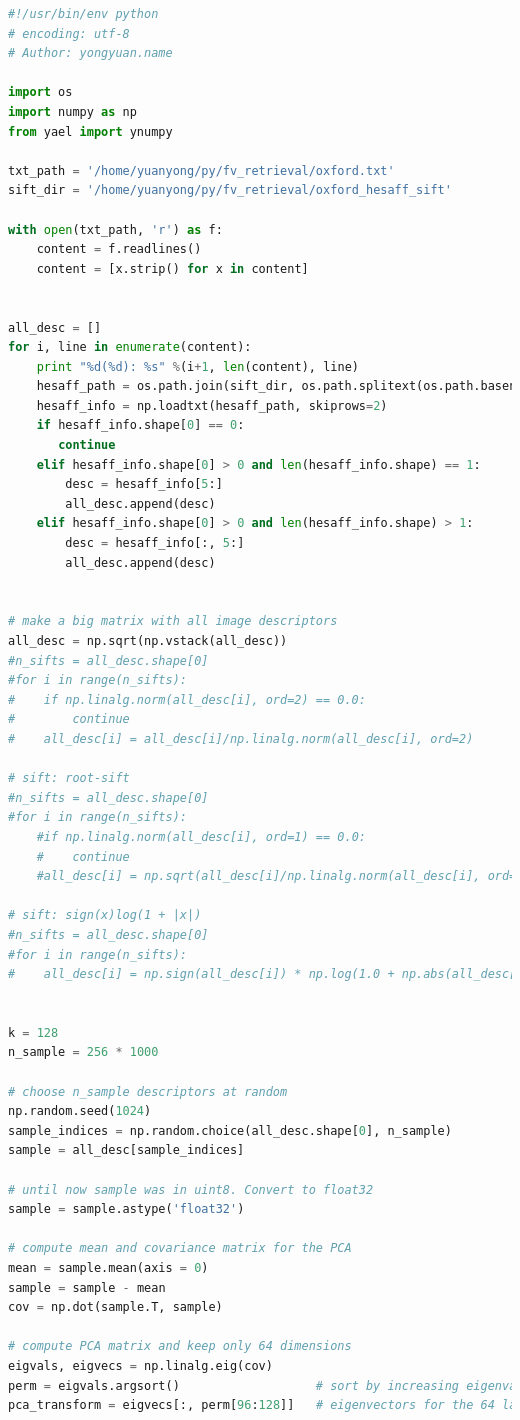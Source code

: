 \documentclass[color=cyan,mathpazo,titlestyle=hang]{elegantbook}
\begin{document}
\begin{lstlisting}[language=python]
#!/usr/bin/env python
# encoding: utf-8
# Author: yongyuan.name

import os
import numpy as np
from yael import ynumpy

txt_path = '/home/yuanyong/py/fv_retrieval/oxford.txt'
sift_dir = '/home/yuanyong/py/fv_retrieval/oxford_hesaff_sift'

with open(txt_path, 'r') as f:
    content = f.readlines()
    content = [x.strip() for x in content]


all_desc = []
for i, line in enumerate(content):
    print "%d(%d): %s" %(i+1, len(content), line)
    hesaff_path = os.path.join(sift_dir, os.path.splitext(os.path.basename(line))[0] + '.hesaff.sift')
    hesaff_info = np.loadtxt(hesaff_path, skiprows=2)
    if hesaff_info.shape[0] == 0:
       continue
    elif hesaff_info.shape[0] > 0 and len(hesaff_info.shape) == 1:
        desc = hesaff_info[5:]
        all_desc.append(desc)
    elif hesaff_info.shape[0] > 0 and len(hesaff_info.shape) > 1:
        desc = hesaff_info[:, 5:]
        all_desc.append(desc)


# make a big matrix with all image descriptors
all_desc = np.sqrt(np.vstack(all_desc))
#n_sifts = all_desc.shape[0]
#for i in range(n_sifts):
#    if np.linalg.norm(all_desc[i], ord=2) == 0.0:
#        continue
#    all_desc[i] = all_desc[i]/np.linalg.norm(all_desc[i], ord=2)

# sift: root-sift
#n_sifts = all_desc.shape[0]
#for i in range(n_sifts):
    #if np.linalg.norm(all_desc[i], ord=1) == 0.0:
    #    continue
    #all_desc[i] = np.sqrt(all_desc[i]/np.linalg.norm(all_desc[i], ord=1))

# sift: sign(x)log(1 + |x|)
#n_sifts = all_desc.shape[0]
#for i in range(n_sifts):
#    all_desc[i] = np.sign(all_desc[i]) * np.log(1.0 + np.abs(all_desc[i]))


k = 128
n_sample = 256 * 1000

# choose n_sample descriptors at random
np.random.seed(1024)
sample_indices = np.random.choice(all_desc.shape[0], n_sample)
sample = all_desc[sample_indices]

# until now sample was in uint8. Convert to float32
sample = sample.astype('float32')

# compute mean and covariance matrix for the PCA
mean = sample.mean(axis = 0)
sample = sample - mean
cov = np.dot(sample.T, sample)

# compute PCA matrix and keep only 64 dimensions
eigvals, eigvecs = np.linalg.eig(cov)
perm = eigvals.argsort()                   # sort by increasing eigenvalue
pca_transform = eigvecs[:, perm[96:128]]   # eigenvectors for the 64 last eigenvalues


\end{lstlisting}
\end{document}
